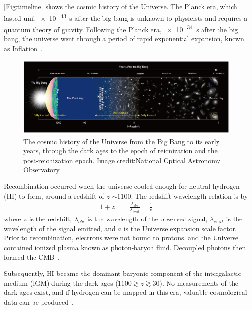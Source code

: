 	\autoref{Fig:timeline} shows the cosmic history of the Universe. The Planck era, which lasted unil \SI{e-43}{s} after the big bang is unknown to physicists and requires a quantum theory of gravity. Following the Planck era, \SI{e-34}{s} after the big bang, the universe went through a period of rapid exponential expansion, known as Inflation~\citep{1981PhRvD..23..347G}.

	\begin{figure}
		\begin{center}
			\includegraphics[width=\linewidth]{Figures/Reionizationtimeline.jpg}
			\caption{The cosmic history of the Universe from the Big Bang to its early years, through the dark ages to the epoch of reionization and the post-reionization epoch. Image credit:National Optical Astronomy Observatory}
			\label{Fig:timeline}
		\end{center}
	\end{figure}
        
	Recombination occurred when the universe cooled enough for neutral hydrogen (HI) to form, around a redshift of $z$ $\sim1100$. The redshift-wavelength relation is  by
	\begin{equation}
	\begin{split}
	1+z & = \frac{\lambda_{obs}}{\lambda_{emit}}= \frac{1}{a}
	\end{split}
	\end{equation}
	where $z$ is the redshift, $\lambda_{obs}$ is the wavelength of the observed signal, $\lambda_{emit}$ is the wavelength of the signal emitted, and $a$ is the Universe expansion scale factor. Prior to recombination, electrons were not bound to protons, and the Universe contained ionized plasma known as photon-baryon fluid. Decoupled photons then formed the CMB~\citep{1965ApJ...142..419P}.

	Subsequently, HI became the dominant baryonic component of the intergalactic medium (IGM) during the dark ages ($1100 \gtrsim z \gtrsim 30$). No measurements of the dark ages exist, and if hydrogen can be mapped in this era, valuable cosmological data can be produced~\citep{11, 2004PhRvL..92u1301L}.
	
